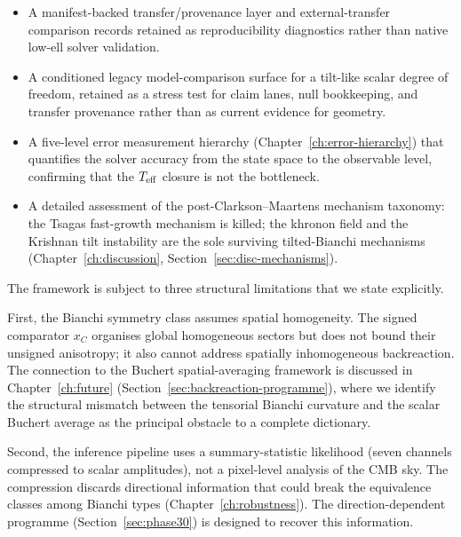 \begin{itemize}
\item A manifest-backed transfer/provenance layer and
  external-transfer comparison records retained as
  reproducibility diagnostics rather than native low-ell
  solver validation.

\item A conditioned legacy model-comparison surface for a
  tilt-like scalar degree of freedom, retained as a stress
  test for claim lanes, null bookkeeping, and transfer
  provenance rather than as current evidence for geometry.

\item A five-level error measurement hierarchy
  (Chapter~\ref{ch:error-hierarchy}) that quantifies the
  solver accuracy from the state space to the observable
  level, confirming that the $T_{\mathrm{eff}}$ closure is not the
  bottleneck.

\item A detailed assessment of the post-Clarkson--Maartens
  mechanism taxonomy: the Tsagas fast-growth mechanism
  is killed; the khronon field and the Krishnan tilt
  instability are the sole surviving tilted-Bianchi
  mechanisms (Chapter~\ref{ch:discussion},
  Section~\ref{sec:disc-mechanisms}).

\end{itemize}



The framework is subject to three structural limitations
that we state explicitly.

First, the Bianchi symmetry class assumes spatial
homogeneity.  The signed comparator $x_C$ organises global
homogeneous sectors but does not bound their unsigned anisotropy;
it also cannot address spatially
inhomogeneous backreaction.  The connection to the Buchert
spatial-averaging framework is discussed in
Chapter~\ref{ch:future}
(Section~\ref{sec:backreaction-programme}), where we
identify the structural mismatch between the tensorial
Bianchi curvature and the scalar Buchert average as the
principal obstacle to a complete dictionary.

Second, the inference pipeline uses a summary-statistic
likelihood (seven channels compressed to scalar amplitudes),
not a pixel-level analysis of the CMB sky.  The compression
discards directional information that could break the
equivalence classes among Bianchi types
(Chapter~\ref{ch:robustness}).  The direction-dependent
programme (Section~\ref{sec:phase30}) is designed to
recover this information.

